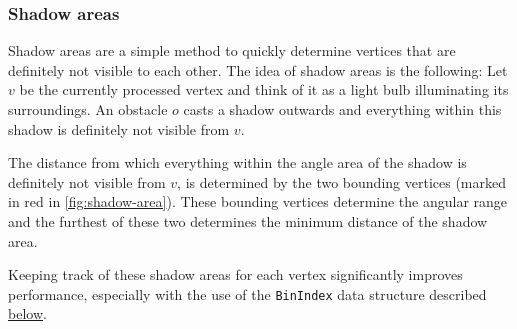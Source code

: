 			\subsubsection{Shadow areas}
			
				Shadow areas are a simple method to quickly determine vertices that are definitely not visible to each other.
				The idea of shadow areas is the following:
				Let $v$ be the currently processed vertex and think of it as a light bulb illuminating its surroundings.
				An obstacle $o$ casts a shadow outwards and everything within this shadow is definitely not visible from $v$.
				
				The distance from which everything within the angle area of the shadow is definitely not visible from $v$, is determined by the two bounding vertices (marked in red in \cref{fig:shadow-area}).
				These bounding vertices determine the angular range and the furthest of these two determines the minimum distance of the shadow area.
				
				Keeping track of these shadow areas for each vertex significantly improves performance, especially with the use of the \texttt{BinIndex} data structure described \hyperref[subsubsec:binindex]{below}.
				
				
